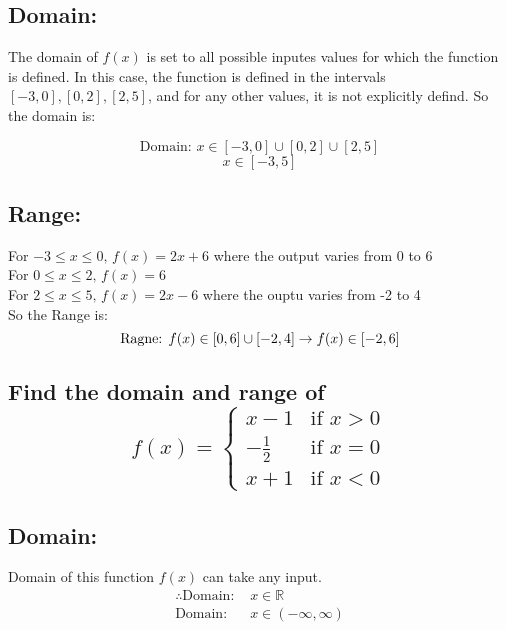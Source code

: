 \documentclass{article}
\begin{document}
\subsection*{Domain: }
The domain of $f(x)$ is set to all possible inputes values for which the
function is defined. In this case, the function is defined in the intervals
$[-3, 0], [0, 2], [2, 5]$, and for any other values, it is not explicitly
defind. So the domain is:

\[ \text{Domain: } x \in [-3, 0] \cup [0, 2] \cup [2, 5] \]
\[  x \in [-3, 5] \]

\subsection*{Range: }
For $ -3 \leq x \leq 0 \text{, } f(x) = 2x + 6 $ where the output varies from 0
to 6\\ For $ 0 \leq x \leq 2 \text{, } f(x) = 6 $\\ For $ 2 \leq x \leq 5
	\text{, } f(x) = 2x - 6 $ where the ouptu varies from -2 to 4 \\ So the Range
is:
\[
	\text{Ragne: } f(x) \in [0, 6] \cup [-2, 4] \\
	\rightarrow f(x) \in [-2, 6]
\]


\newpage
\subsection{Find the domain and range of \[
		f(x) = \begin{cases}
			x - 1 & \text{if } x > 0 \\ - \frac{1}{2} & \text{if } x = 0 \\ x + 1 &
			   \text{if } x < 0
		\end{cases}
	\]}

\subsection*{Domain: }
Domain of this function $f(x)$ can take any input.
\begin{align*}
	\therefore \text{Domain: } & x \in \mathbb{R}\\
	\text{Domain: } & x \in (-\infty, \infty)
\end{align*}
\end{document}
